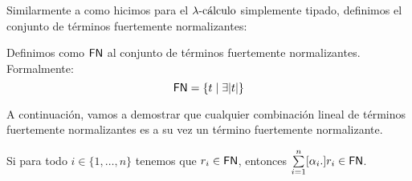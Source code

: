 Similarmente a como hicimos para el \( \lambdacalculus \) simplemente tipado, definimos el conjunto de términos fuertemente normalizantes:

\begin{definition}
  Definimos como \( \snset \) al conjunto de términos fuertemente normalizantes. Formalmente:
  \[ \snset = \{ t \mid \exists \lpl{t} \} \]
\end{definition}

A continuación, vamos a demostrar que cualquier combinación lineal de términos fuertemente normalizantes es a su vez un término fuertemente normalizante.

\begin{lemma}\label{lem:sum_sn}
  Si para todo \( i \in \{1, \ldots, n\} \) tenemos que \( r_i \in \snset \), entonces \( \sum\limits_{i = 1}^{n} [\alpha_i .] r_i \in \snset \).
\end{lemma}

